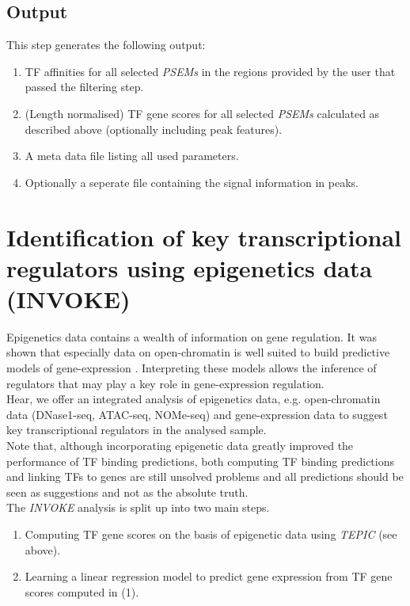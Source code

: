 \documentclass{article}
\begin{document}
\subsection*{Output}
This step generates the following output:
\begin{enumerate}
\item TF affinities for all selected \textit{PSEMs} in the regions provided by the user that passed the filtering step. 
\item (Length normalised) TF gene scores for all selected \textit{PSEMs} calculated as described above (optionally including peak features). 
\item A meta data file listing all used parameters.
\item Optionally a seperate file containing the signal information in peaks. 
\end{enumerate}

\newpage

\section*{Identification of key transcriptional regulators using epigenetics data (INVOKE)}
Epigenetics data contains a wealth of information on gene regulation. It was shown that especially
data on open-chromatin is well suited to build predictive models of gene-expression \cite{pmid27899623,pmid22955983,pmid25231769,pmid22954627}.
Interpreting these models allows the inference of regulators that may play a key role in gene-expression regulation.
\bigskip
\\Hear, we offer an integrated analysis of epigenetics data, e.g. open-chromatin data (DNase1-seq, ATAC-seq, NOMe-seq) and gene-expression data
to suggest key transcriptional regulators in the analysed sample.
\bigskip
\\Note that, although incorporating epigenetic data greatly improved the performance of TF binding predictions, both computing TF binding predictions and linking TFs to genes are still unsolved problems and all predictions
should be seen as suggestions and not as the absolute truth.
\bigskip
\\The \textit{INVOKE} analysis is split up into two main steps. 
\begin{enumerate}
\item Computing TF gene scores on the basis of epigenetic data using \textit{TEPIC} (see above).
\item Learning a linear regression model to predict gene expression from TF gene scores computed in (1).
\end{enumerate}
\end{document}
